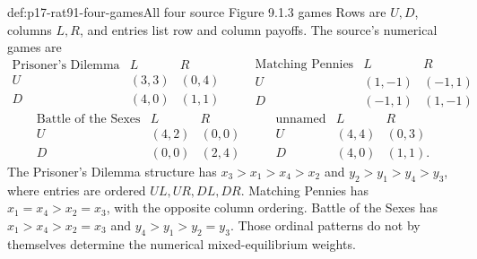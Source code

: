 \begin{hbdefinition}{def:p17-rat91-four-games}{All four source Figure 9.1.3 games}
Rows are \(U,D\), columns \(L,R\), and entries list row and column
payoffs. The source's numerical games are
\[
\begin{array}{c|cc}\text{Prisoner's Dilemma}&L&R\\\hline
 U&(3,3)&(0,4)\\D&(4,0)&(1,1)\end{array}
\qquad
\begin{array}{c|cc}\text{Matching Pennies}&L&R\\\hline
 U&(1,-1)&(-1,1)\\D&(-1,1)&(1,-1)\end{array}
\]
\[
\begin{array}{c|cc}\text{Battle of the Sexes}&L&R\\\hline
 U&(4,2)&(0,0)\\D&(0,0)&(2,4)\end{array}
\qquad
\begin{array}{c|cc}\text{unnamed}&L&R\\\hline
 U&(4,4)&(0,3)\\D&(4,0)&(1,1).\end{array}
\]
The Prisoner's Dilemma structure has \(x_3>x_1>x_4>x_2\)
and \(y_2>y_1>y_4>y_3\), where entries are ordered
\(UL,UR,DL,DR\). Matching Pennies has
\(x_1=x_4>x_2=x_3\), with the opposite column ordering.
Battle of the Sexes has \(x_1>x_4>x_2=x_3\) and
\(y_4>y_1>y_2=y_3\). Those ordinal patterns do not by
themselves determine the numerical mixed-equilibrium weights.
\end{hbdefinition}

